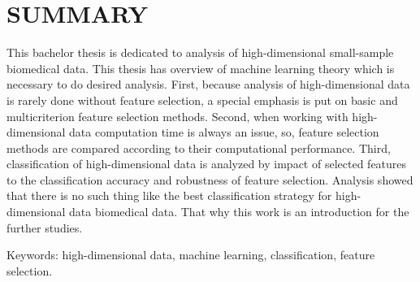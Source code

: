 \section*{SUMMARY}
\label{summary}

This bachelor thesis is dedicated to analysis of high-dimensional small-sample biomedical data. This thesis has overview of machine learning theory which is necessary to do desired analysis. First, because analysis of high-dimensional data is rarely done without feature selection, a special emphasis is put on basic and multicriterion feature selection methods. Second, when working with high-dimensional data computation time is always an issue, so, feature selection methods are compared according to their computational performance. Third, classification of high-dimensional data is analyzed by impact of selected features to the classification accuracy and robustness of feature selection. Analysis showed that there is no such thing like the best classification strategy for high-dimensional data biomedical data. That why this work is an introduction for the further studies.


Keywords: high-dimensional data, machine learning, classification, feature selection.
